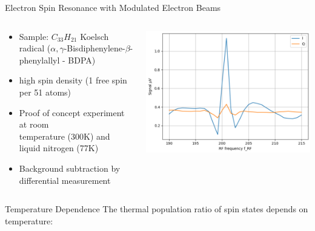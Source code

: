 \documentclass[final]{beamer}
\begin{document}
\begin{frame}[fragile]{}
\begin{columns}[T]
\begin{column}{.49\linewidth}
\begin{block}{\Large Electron Spin Resonance with Modulated Electron Beams}
        \begin{columns}
          \begin{column}{0.6\columnwidth}
            \begin{itemize}
              \item Sample: $C_{33}H_{21}$
                Koelsch radical ($\alpha,\gamma$-Bisdiphenylene-$\beta$-phenylallyl - BDPA)
              \item high spin density (1 free spin per 51 atoms)
              \item Proof of concept experiment at room\\temperature (300K) and liquid nitrogen (77K)
              \item Background subtraction by differential measurement
            \end{itemize}
          \end{column}
          \begin{column}{0.4\columnwidth}
            \includegraphics[width=\columnwidth]{figures/eprsignal.png}
          \end{column}
        \end{columns}
      \end{block}

      \begin{block}{\Large Temperature Dependence}
        The thermal population ratio of spin states depends on temperature:
        

\end{block}
\end{column}
\end{columns}
\end{frame}
\end{document}
